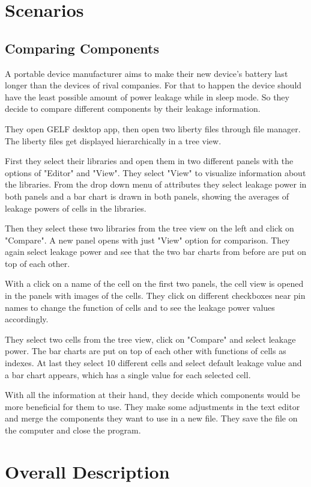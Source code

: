 \documentclass[10pt,a4paper]{report}
\begin{document}
\chapter{Scenarios}
\section{Comparing Components}
A portable device manufacturer aims to make their new device's battery last longer than the devices 
of rival companies. For that to happen the device should have the least possible amount of power 
leakage while in sleep mode. So they decide to compare different components by their 
leakage information. 

They open GELF desktop app, then open two liberty files through file manager. 
The liberty files get displayed hierarchically in a tree view.

First they select their libraries and open them in two different panels with
the options of "Editor" and "View". They select "View" to visualize information about the libraries.
From the drop down menu of attributes they select leakage power in both panels and a bar chart is drawn in
both panels, showing the averages of leakage powers of cells in the libraries. 

Then they select these two libraries from the tree view on the left and click on "Compare". 
A new panel opens with just "View" option for comparison. They again select leakage power and see that the two bar charts 
from before are put on top of each other.

With a click on a name of the cell on the first two panels, the cell view is opened in the panels with images
of the cells. They click on different checkboxes near pin names to change the function of cells and to see the leakage 
power values accordingly.

They select two cells from the tree view, click on "Compare" and select leakage power. The 
bar charts are put on top of each other with functions of cells as indexes. At last they select 10 different cells and select
default leakage value and a bar chart appears, which has a single value for each selected cell.

With all the information at their hand, they decide which components would be more beneficial for them to use. 
They make some adjustments in the text editor and merge the components they want to use in a new file. They save the file 
on the computer and close the program.
\chapter{Overall Description}
\end{document}
